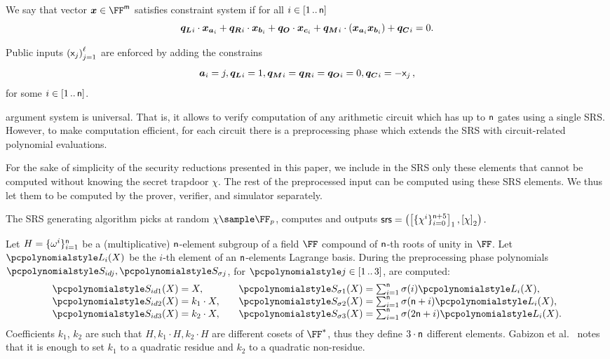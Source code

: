 We say that vector $\vx \in \FF^\noofw$ satisfies constraint system if for all $i
\in [1 \, .. \, \mathsf{n}]$
\[
\vql_i \cdot \vx_{\va_i} + \vqr_i \cdot \vx_{\vb_i} + \vqo \cdot \vx_{\vc_i} +
\vqm_i \cdot (\vx_{\va_i} \vx_{\vb_i}) + \vqc_i = 0. 
\]

Public inputs $\left(\mathsf{x}_j\right)_{j = 1}^{\mathsf{\ell}}$ are enforced by adding the constrains
\[ \va_i = j, \vql_i = 1, \vqm_i = \vqr_i = \vqo_i = 0, \vqc_i = -\inp_j\,,
\]
for some $i \in [1 \, .. \, \mathsf{n}]$.

\label{sec:plonk_explained}
\plonk{} argument system is universal. That is, it allows to verify computation
of any arithmetic circuit which has up to $\mathsf{n}$
gates using a single SRS. However, to make computation efficient, for each
circuit there is a preprocessing phase which extends the SRS with
circuit-related polynomial evaluations.

For the sake of simplicity of the security reductions presented in this paper, we
include in the SRS only these elements that cannot be computed without knowing
the secret trapdoor $\chi$. The rest of the preprocessed input can
be computed using these SRS elements. We thus let them to be computed by the
prover, verifier, and simulator separately.

The SRS generating algorithm picks at random $\chi \sample \FF_p$, computes
and outputs
\(
\mathsf{srs} = \left(\left[\{\chi^i\}_{i = 0}^{\mathsf{n} + 5}\right]_{1},
\left[\chi\right]_{2} \right).
\)

Let $H = \{\omega^i\}_{i = 1}^{\mathsf{n} }$ be a
(multiplicative) $\mathsf{n}$-element subgroup of a field $\FF$
compound of $\mathsf{n}$-th roots of unity in $\FF$. Let $\lag_i(X)$ be
the $i$-th element of an $\mathsf{n}$-elements Lagrange basis. During
the preprocessing phase polynomials $\p{S_{id j}}, \p{S_{\sigma j}}$, for
$\p{j} \in \range{1}{3}$, are computed:
\begin{equation*}
\begin{aligned}
\p{S_{id 1}}(X) & = X,\\[\myskip]
\p{S_{id 2}}(X) & = k_1 \cdot X,\\[\myskip]
\p{S_{id 3}}(X) & = k_2 \cdot X,
\end{aligned}
\qquad
\begin{aligned}
\p{S_{\sigma 1}}(X) & = {\textstyle{\sum_{i = 1}^{\noofc} \sigma(i) \lag_i(X)}},\\[\myskip]
\p{S_{\sigma 2}}(X) & = {\textstyle \sum_{i = 1}^{\noofc}
	\sigma(\noofc + i) \lag_i(X)},\\[\myskip]
\p{S_{\sigma 3}}(X) & ={\textstyle\sum_{i = 1}^{\noofc} \sigma(2 \noofc + i) \lag_i(X)}.
\end{aligned}
\end{equation*}
Coefficients $k_1$, $k_2$ are such that $H, k_1 \cdot H, k_2 \cdot H$ are
different cosets of $\FF^*$, thus they define $3 \cdot \mathsf{n}$
different elements. Gabizon et al.~\cite{EPRINT:GabWilCio19} notes that it is enough to set
$k_1$ to a quadratic residue and $k_2$ to a quadratic non-residue.

